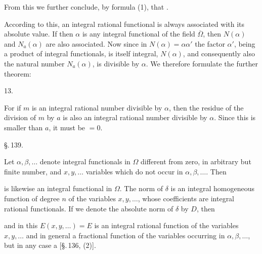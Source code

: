 
From this we further conclude, by formula (1), that .

According to this, an integral rational functional is always associated with its absolute value. If then $\alpha$ is any integral functional of the field $\overline{\Omega}$, then $N(\alpha)$ and $N_a(\alpha)$ are also associated. Now since in $N(\alpha)=\alpha\alpha'$ the factor $\alpha'$, being a product of integral functionals, is itself integral, $N(\alpha)$, and consequently also the natural number $N_a(\alpha)$, is divisible by $\alpha$. We therefore formulate the further theorem:

13. 

For if $m$ is an integral rational number divisible by $\alpha$, then the residue of the division of $m$ by $a$ is also an integral rational number divisible by $\alpha$. Since this is smaller than $a$, it must be $=0$.

\S.\,139.


Let $\alpha, \beta, \ldots$ denote integral functionals in $\Omega$ different from zero, in arbitrary but finite number, and $x, y, \ldots$ variables which do not occur in $\alpha, \beta, \ldots$. Then


is likewise an integral functional in $\Omega$. The norm of $\delta$ is an integral homogeneous function of degree $n$ of the variables $x, y, \ldots$, whose coefficients are integral rational functionals. If we denote the absolute norm of $\delta$ by $D$, then


and in this $E(x, y, \ldots) = E$ is an integral rational function of the variables $x, y, \ldots$ and in general a fractional function of the variables occurring in $\alpha, \beta, \ldots$, but in any case a  [\S.\,136, (2)].
